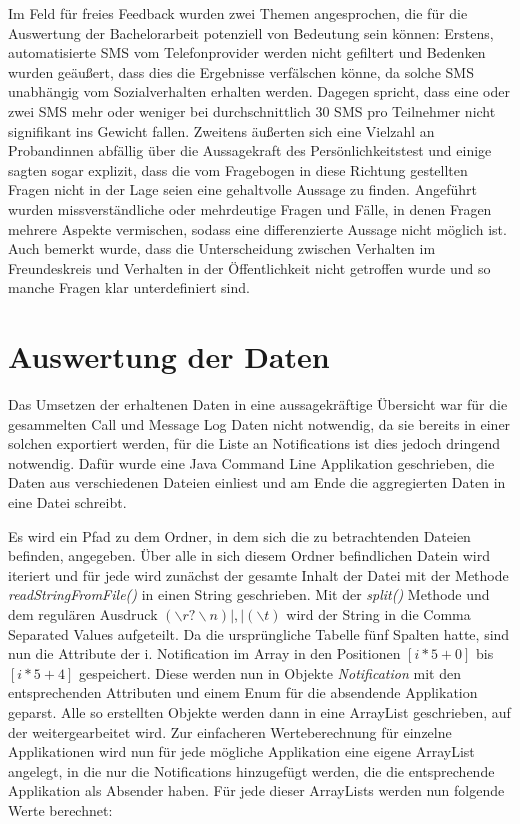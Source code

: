 Im Feld für freies Feedback wurden zwei Themen angesprochen, die für die Auswertung der Bachelorarbeit potenziell von Bedeutung sein können:
Erstens, automatisierte SMS vom Telefonprovider werden nicht gefiltert und Bedenken wurden geäußert, dass dies die Ergebnisse verfälschen könne, da solche SMS unabhängig vom Sozialverhalten erhalten werden.
Dagegen spricht, dass eine oder zwei SMS mehr oder weniger bei durchschnittlich 30 SMS pro Teilnehmer nicht signifikant ins Gewicht fallen.
Zweitens äußerten sich eine Vielzahl an Probandinnen abfällig über die Aussagekraft des Persönlichkeitstest und einige sagten sogar explizit, dass die vom Fragebogen in diese Richtung gestellten Fragen nicht in der Lage seien eine gehaltvolle Aussage zu finden.
Angeführt wurden missverständliche oder mehrdeutige Fragen und Fälle, in denen Fragen mehrere Aspekte vermischen, sodass eine differenzierte Aussage nicht möglich ist. 
Auch bemerkt wurde, dass die Unterscheidung zwischen Verhalten im Freundeskreis und Verhalten in der Öffentlichkeit nicht getroffen wurde und so manche Fragen klar unterdefiniert sind.

\section{Auswertung der Daten}

Das Umsetzen der erhaltenen Daten in eine aussagekräftige Übersicht war für die gesammelten Call und Message Log Daten nicht notwendig, da sie bereits in einer solchen exportiert werden, für die Liste an Notifications ist dies jedoch dringend notwendig.
Dafür wurde eine Java Command Line Applikation geschrieben, die Daten aus verschiedenen Dateien einliest und am Ende die aggregierten Daten in eine Datei schreibt.
\par
Es wird ein Pfad zu dem Ordner, in dem sich die zu betrachtenden Dateien befinden, angegeben.
Über alle in sich diesem Ordner befindlichen Datein wird iteriert und für jede wird zunächst der gesamte Inhalt der Datei mit der Methode \emph{readStringFromFile()} in einen String geschrieben.
Mit der \emph{split()} Methode und dem regulären Ausdruck  $(\backslash r?\backslash n)|,|(\backslash t)$ wird der String in die Comma Separated Values aufgeteilt.
Da die ursprüngliche Tabelle fünf Spalten hatte, sind nun die Attribute der i. Notification im Array in den Positionen $ [i * 5 + 0]$ bis $ [i * 5 + 4]$ gespeichert.
Diese werden nun in Objekte \emph{Notification} mit den entsprechenden Attributen und einem Enum für die absendende Applikation geparst.
Alle so erstellten Objekte werden dann in eine ArrayList geschrieben, auf der weitergearbeitet wird.
Zur einfacheren Werteberechnung für einzelne Applikationen wird nun für jede mögliche Applikation eine eigene ArrayList angelegt, in die nur die Notifications hinzugefügt werden, die die entsprechende Applikation als Absender haben.
Für jede dieser ArrayLists werden nun folgende Werte berechnet:

